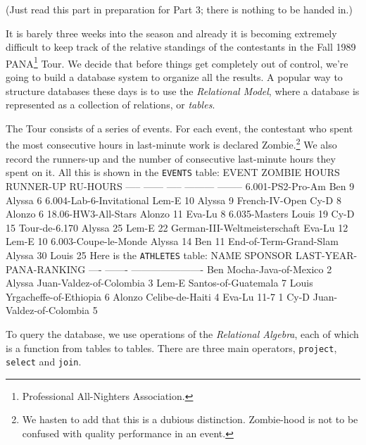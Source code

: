 (Just read this part in preparation for Part 3; there is nothing to be handed
in.)

It is barely three weeks into the season and already it is becoming extremely
difficult to keep track of the relative standings of the contestants in the
Fall 1989 PANA\footnote{
 Professional All-Nighters Association.
 }
 Tour.  We decide that before things get completely out of control, we're
going to build a database system to organize all the results.  A popular way
to structure databases these days is to use the {\em Relational Model\/},
where a database is represented as a collection of relations, or {\em
tables\/}.

The Tour consists of a series of events.  For each event, the contestant who
spent the most consecutive hours in last-minute work is declared
Zombie.\footnote{
 We hasten to add that this is a dubious distinction.   Zombie-hood is not to
be confused with quality performance in an event.
 }
 We also record the runners-up and the number of consecutive last-minute
hours they spent on it. All this is shown in the {\tt EVENTS} table:
 \beginlisp
EVENT                            ZOMBIE     HOURS  RUNNER-UP  RU-HOURS
-----                            ------     -----  ---------  --------
6.001-PS2-Pro-Am                 Ben        9      Alyssa     6
6.004-Lab-6-Invitational         Lem-E      10     Alyssa     9
French-IV-Open                   Cy-D       8      Alonzo     6
18.06-HW3-All-Stars              Alonzo     11     Eva-Lu     8
6.035-Masters                    Louis      19     Cy-D       15
Tour-de-6.170                    Alyssa     25     Lem-E      22
German-III-Weltmeisterschaft     Eva-Lu     12     Lem-E      10
6.003-Coupe-le-Monde             Alyssa     14     Ben        11
End-of-Term-Grand-Slam           Alyssa     30     Louis      25
 \endlisp
 Here is the {\tt ATHLETES} table:
 \beginlisp
NAME       SPONSOR                    LAST-YEAR-PANA-RANKING
----       -------                    ----------------------
Ben        Mocha-Java-of-Mexico       2
Alyssa     Juan-Valdez-of-Colombia    3
Lem-E      Santos-of-Guatemala        7
Louis      Yrgacheffe-of-Ethiopia     6
Alonzo     Celibe-de-Haiti            4
Eva-Lu     11-7                       1
Cy-D       Juan-Valdez-of-Colombia    5
 \endlisp

To query the database, we use operations of the {\em Relational Algebra\/},
each of which is a function from tables to tables.  There are three main
operators, {\tt project}, {\tt select} and {\tt join}.

